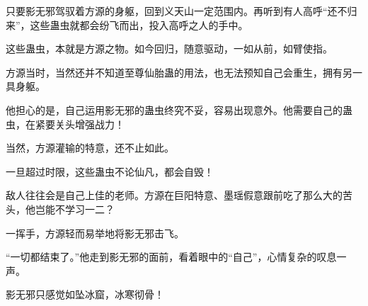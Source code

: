 \begin{this_body}
只要影无邪驾驭着方源的身躯，回到义天山一定范围内。再听到有人高呼“还不归来”，这些蛊虫就都会纷飞而出，投入高呼之人的手中。

这些蛊虫，本就是方源之物。如今回归，随意驱动，一如从前，如臂使指。

方源当时，当然还并不知道至尊仙胎蛊的用法，也无法预知自己会重生，拥有另一具身躯。

他担心的是，自己运用影无邪的蛊虫终究不妥，容易出现意外。他需要自己的蛊虫，在紧要关头增强战力！

当然，方源灌输的特意，还不止如此。

一旦超过时限，这些蛊虫不论仙凡，都会自毁！

敌人往往会是自己上佳的老师。方源在巨阳特意、墨瑶假意跟前吃了那么大的苦头，他岂能不学习一二？

一挥手，方源轻而易举地将影无邪击飞。

“一切都结束了。”他走到影无邪的面前，看着眼中的“自己”，心情复杂的叹息一声。

影无邪只感觉如坠冰窟，冰寒彻骨！

\end{this_body}

